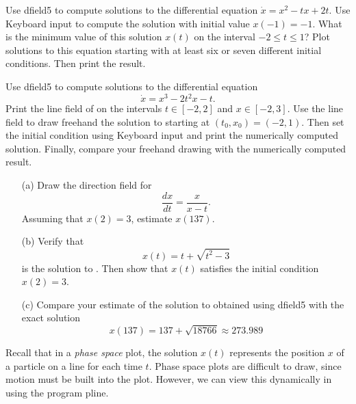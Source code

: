 \begin{exercise} \label{c3.2.2}
Use {\sf dfield5} to compute solutions to the differential equation
$\dot{x} = x^2-tx+2t$. Use {\sf Keyboard input} to compute the solution
with initial value $x(-1)=-1$.  What is the minimum value of this
solution $x(t)$ on the interval $-2\leq t\leq 1$?  Plot
solutions to this equation starting with at least six or seven
different initial conditions. Then print the result.
\end{exercise}

\begin{exercise} \label{c3.2.3}
Use {\sf dfield5} to compute solutions to the differential
equation
\begin{equation}  \label{E:freehand}
\dot{x} = x^3-2t^2x-t.
\end{equation}
Print the line field of  on the intervals
$t\in[-2,2]$ and $x\in[-2,3]$.  Use the line field to draw freehand
the solution to  starting at $(t_0,x_0)=(-2,1)$.
Then set the initial condition using {\sf Keyboard input}
and print the numerically computed solution. Finally, compare
your freehand drawing with the numerically computed result.
\end{exercise}

\begin{exercise}  \label{exer:at}
\begin{itemize}
\item[(a)]  Draw the direction field for
\begin{equation} \label{ex:at}
\frac{dx}{dt} = \frac{x}{x-t}.
\end{equation}
Assuming that $x(2)=3$, estimate $x(137)$.
\item[(b)]  Verify that
\[
x(t) = t + \sqrt{t^2-3}
\]
is the solution to .  Then show that $x(t)$ satisfies the
initial condition $x(2)=3$.
\item[(c)]  Compare your estimate of the solution to 
obtained using {\sf dfield5} with the exact solution
\[
x(137)= 137 +\sqrt{18766} \approx 273.989
\]
\end{itemize}
\end{exercise}

 \label{S:PSP&E}

Recall that in a {\em phase space\/}  plot, the 
solution $x(t)$ represents the position $x$ of a particle on a line 
for each time $t$.  Phase space plots are difficult to draw, since 
motion must be built into the plot.  However, we can view this 
dynamically in \Matlab using the program {\sf pline}. 

